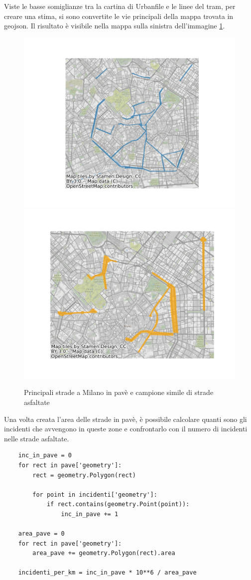 \documentclass[a4paper,12pt]{report}
\begin{document}
Viste le basse somiglianze tra la cartina di Urbanfile e le linee del tram, 
per creare una stima, si sono convertite le vie principali della mappa trovata 
in geojson. 
Il risultato è visibile nella mappa sulla sinistra dell'immagine \ref{fig:mappa-pave}.

\begin{figure}
    \includegraphics[width=0.5\linewidth]{../src/pave/mappa_pave.png}
    \includegraphics[width=0.5\linewidth]{../src/pave/mappa_asfalto.png}
    \caption{Principali strade a Milano in pavè e campione simile di strade asfaltate}
    \label{fig:mappa-pave}
\end{figure}

Una volta creata l'area delle strade in pavè, è possibile calcolare quanti sono gli 
incidenti che avvengono in queste zone e confrontarlo con il numero di incidenti 
nelle strade asfaltate.

\begin{lstlisting}
    inc_in_pave = 0
    for rect in pave['geometry']: 
        rect = geometry.Polygon(rect)

        for point in incidenti['geometry']: 
            if rect.contains(geometry.Point(point)): 
                inc_in_pave += 1

    area_pave = 0
    for rect in pave['geometry']: 
        area_pave += geometry.Polygon(rect).area

    incidenti_per_km = inc_in_pave * 10**6 / area_pave
\end{lstlisting}
\end{document}
